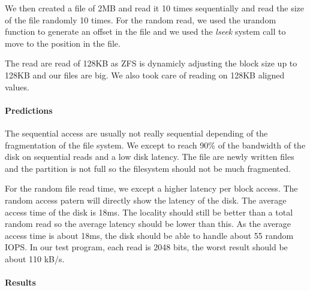 We then created a file of 2MB and read it 10 times sequentially and read the
size of the file randomly 10 times.
For the random read, we used the urandom function to generate an offset in the
file and we used the \emph{lseek} system call to move to the position in the file.

The read are read of 128KB as ZFS is dynamicly adjusting the block size up to
128KB and our files are big.
We also took care of reading on 128KB aligned values.

\paragraph{Predictions}
The sequential access are usually not really sequential depending of the
fragmentation of the file system.
We except to reach 90\% of the bandwidth of the disk on sequential reads
and a low disk latency.
The file are newly written files and the partition is not full so the filesystem
should not be much fragmented.

For the random file read time, we except a higher latency per block access.
The random access patern will directly show the latency of the disk.
The average access time of the disk is 18ms.
The locality should still be better than a total random read so the average
latency should be lower than this.
As the average access time is about 18ms, the disk should be able to handle
about 55 random IOPS.
In our test program, each read is 2048 bits, the worst result should be about 110 kB/s.

\paragraph{Results}

